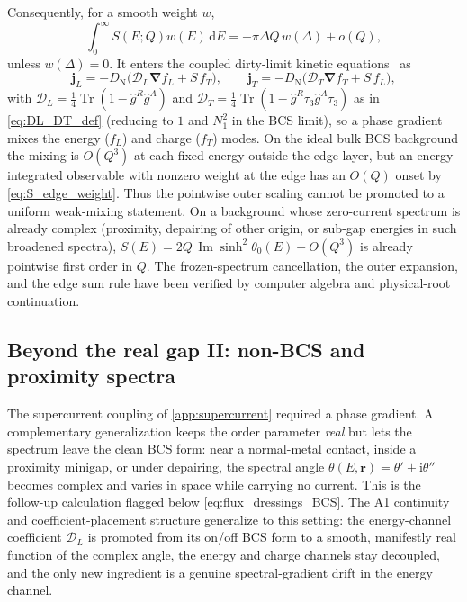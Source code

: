 \documentclass[
  aps,
  prb,
  preprint,
  superscriptaddress,
  longbibliography,
  nofootinbib
]{revtex4-2}
\newcommand{\dd}{\mathrm{d}}
\newcommand{\ii}{\mathrm{i}}
\newcommand{\Tr}{\operatorname{Tr}}
\newcommand{\br}{\mathbf{r}}
\newcommand{\bnabla}{\boldsymbol{\nabla}}
\newcommand{\DOS}{N_1}
\newcommand{\DN}{D_{\mathrm{N}}}
\newcommand{\fL}{f_L}
\newcommand{\fT}{f_T}
\newcommand{\hatg}{\hat{g}}
\newcommand{\Imag}{\operatorname{Im}}
\begin{document}
Consequently, for a smooth weight \(w\),
\begin{equation}
  \int_0^\infty S(E;Q)w(E)\,\dd E
  =
  -\pi\Delta Q\,w(\Delta)+o(Q),
  \label{eq:S_edge_weight}
\end{equation}
unless \(w(\Delta)=0\).
It enters the coupled dirty-limit kinetic equations~\cite{belzig1999} as
\begin{equation}
  \mathbf j_L=-\DN\big(\mathcal D_L\bnabla\fL+S\,\fT\big),\qquad
  \mathbf j_T=-\DN\big(\mathcal D_T\bnabla\fT+S\,\fL\big),
  \label{eq:coupled_LT}
\end{equation}
with \(\mathcal D_L=\tfrac14\Tr(1-\hatg^R\hatg^A)\) and
\(\mathcal D_T=\tfrac14\Tr(1-\hatg^R\tau_3\hatg^A\tau_3)\) as in
\cref{eq:DL_DT_def} (reducing to \(1\) and \(\DOS^2\)
in the BCS limit), so a phase gradient mixes the energy (\(\fL\)) and charge
(\(\fT\)) modes. On the ideal bulk BCS background the mixing is
\(O(Q^3)\) at each fixed energy outside the edge layer, but an
energy-integrated observable with nonzero weight at the edge has an
\(O(Q)\) onset by \cref{eq:S_edge_weight}. Thus the pointwise outer
scaling cannot be promoted to a uniform weak-mixing statement. On a
background whose zero-current spectrum is already complex (proximity,
depairing of other origin, or sub-gap energies in such broadened
spectra), \(S(E)=2Q\,\Imag\sinh^2\theta_0(E)+O(Q^3)\) is already
pointwise first order in \(Q\). The frozen-spectrum cancellation, the
outer expansion, and the edge sum rule have been verified by computer
algebra and physical-root continuation.


\subsection{Beyond the real gap II: non-BCS and proximity spectra}
\label{app:proximity}

The supercurrent coupling of \cref{app:supercurrent} required a phase gradient. A
complementary generalization keeps the order parameter \emph{real} but lets the
spectrum leave the clean BCS form: near a normal-metal contact, inside a proximity
minigap, or under depairing, the spectral angle
\(\theta(E,\br)=\theta'+\ii\theta''\) becomes complex and varies in space while
carrying no current. This is the follow-up calculation flagged below
\cref{eq:flux_dressings_BCS}. The A1 continuity and coefficient-placement
structure generalize to this setting: the
energy-channel coefficient \(\mathcal D_L\) is promoted from its on/off
BCS form to a smooth, manifestly real function of the complex
angle, the energy and charge channels stay decoupled, and the only new ingredient is
a genuine spectral-gradient drift in the energy channel.
\end{document}
